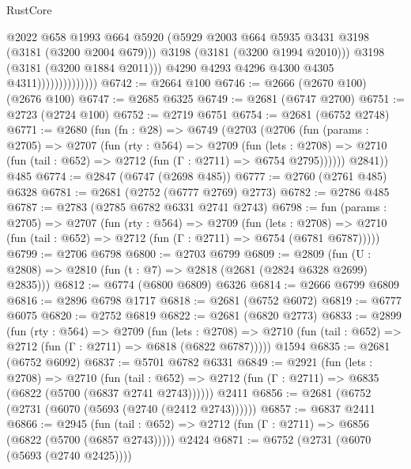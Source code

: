 \begin{lexlean}{RustCore}
\begin{coremodule}
                                    @2022
                                    @658
                                    @1993
                                    @664
                                    @5920
                                    (@5929 @2003 @664 @5935 @3431 @3198 (@3181 (@3200 @2004 @679)))
                                    @3198
                                    (@3181 (@3200 @1994 @2010)))
                                  @3198
                                  (@3181 (@3200 @1884 @2011)))
                                @4290
                                @4293
                                @4296
                                @4300
                                @4305
                                @4311))))))))))))))
@6742 := @2664 @100
@6746 := @2666 (@2670 @100) (@2676 @100)
@6747 := @2685 @6325
@6749 := @2681 (@6747 @2700)
@6751 := @2723 (@2724 @100)
@6752 := @2719 @6751
@6754 := @2681 (@6752 @2748)
@6771 := @2680
    (fun (fn : @28) =>
    @6749
      (@2703
        (@2706
          (fun (params : @2705) =>
          @2707
            (fun (rty : @564) =>
            @2709
              (fun (lets : @2708) =>
              @2710 (fun (tail : @652) => @2712 (fun (Γ : @2711) => @6754 @2795))))))
        @2841))
    @485
@6774 := @2847 (@6747 (@2698 @485))
@6777 := @2760 (@2761 @485) @6328
@6781 := @2681 (@2752 (@6777 @2769) @2773)
@6782 := @2786 @485
@6787 := @2783 (@2785 @6782 @6331 @2741 @2743)
@6798 := fun (params : @2705) =>
  @2707
    (fun (rty : @564) =>
    @2709
      (fun (lets : @2708) =>
      @2710 (fun (tail : @652) => @2712 (fun (Γ : @2711) => @6754 (@6781 @6787)))))
@6799 := @2706 @6798
@6800 := @2703 @6799
@6809 := @2809 (fun (U : @2808) => @2810 (fun (t : @7) => @2818 (@2681 (@2824 @6328 @2699) @2835)))
@6812 := @6774 (@6800 @6809) @6326
@6814 := @2666 @6799 @6809
@6816 := @2896 @6798 @1717
@6818 := @2681 (@6752 @6072)
@6819 := @6777 @6075
@6820 := @2752 @6819
@6822 := @2681 (@6820 @2773)
@6833 := @2899
    (fun (rty : @564) =>
    @2709
      (fun (lets : @2708) =>
      @2710 (fun (tail : @652) => @2712 (fun (Γ : @2711) => @6818 (@6822 @6787)))))
    @1594
@6835 := @2681 (@6752 @6092)
@6837 := @5701 @6782 @6331
@6849 := @2921
    (fun (lets : @2708) =>
    @2710
      (fun (tail : @652) => @2712 (fun (Γ : @2711) => @6835 (@6822 (@5700 (@6837 @2741 @2743))))))
    @2411
@6856 := @2681 (@6752 (@2731 (@6070 (@5693 (@2740 (@2412 @2743))))))
@6857 := @6837 @2411
@6866 := @2945
    (fun (tail : @652) => @2712 (fun (Γ : @2711) => @6856 (@6822 (@5700 (@6857 @2743)))))
    @2424
@6871 := @6752 (@2731 (@6070 (@5693 (@2740 @2425))))

\end{coremodule}
\end{lexlean}
